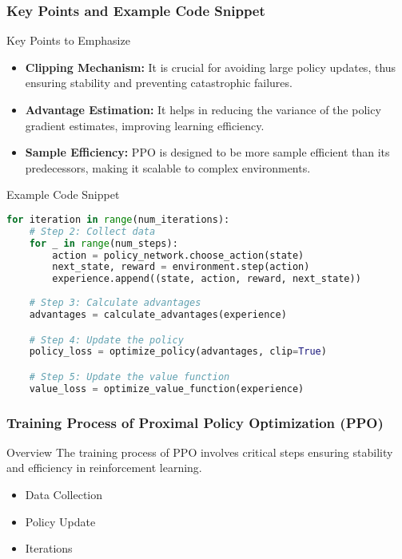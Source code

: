 \documentclass{beamer}
\begin{document}
\begin{frame}[fragile]
    \frametitle{Key Points and Example Code Snippet}

    \begin{block}{Key Points to Emphasize}
        \begin{itemize}
            \item \textbf{Clipping Mechanism:} It is crucial for avoiding large policy updates, thus ensuring stability and preventing catastrophic failures.
            \item \textbf{Advantage Estimation:} It helps in reducing the variance of the policy gradient estimates, improving learning efficiency.
            \item \textbf{Sample Efficiency:} PPO is designed to be more sample efficient than its predecessors, making it scalable to complex environments.
        \end{itemize}
    \end{block}
    
    \begin{block}{Example Code Snippet}
        \begin{lstlisting}[language=Python]
for iteration in range(num_iterations):
    # Step 2: Collect data
    for _ in range(num_steps):
        action = policy_network.choose_action(state)
        next_state, reward = environment.step(action)
        experience.append((state, action, reward, next_state))
    
    # Step 3: Calculate advantages
    advantages = calculate_advantages(experience)

    # Step 4: Update the policy
    policy_loss = optimize_policy(advantages, clip=True)

    # Step 5: Update the value function
    value_loss = optimize_value_function(experience)
        \end{lstlisting}
    \end{block}
\end{frame}

\begin{frame}[fragile]
    \frametitle{Training Process of Proximal Policy Optimization (PPO)}
    \begin{block}{Overview}
        The training process of PPO involves critical steps ensuring stability and efficiency in reinforcement learning. 
        \begin{itemize}
            \item Data Collection
            \item Policy Update
            \item Iterations
        \end{itemize}
    \end{block}
\end{frame}
\end{document}
